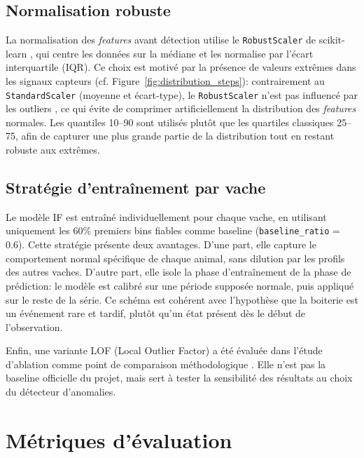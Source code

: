 \subsection{Normalisation robuste}
La normalisation des \textit{features} avant détection utilise le \texttt{RobustScaler} de
scikit-learn \citep{sklearn_api}, qui centre les données sur la médiane et les normalise
par l'écart interquartile (IQR). Ce choix est motivé par la présence de valeurs extrêmes
dans les signaux capteurs (cf. Figure~\ref{fig:distribution_steps}): contrairement au
\texttt{StandardScaler} (moyenne et écart-type), le \texttt{RobustScaler} n'est pas
influencé par les outliers \citep{leys2013detecting}, ce qui évite de comprimer
artificiellement la distribution des \textit{features} normales. Les quantiles 10--90 sont utilisés
plutôt que les quartiles classiques 25--75, afin de capturer une plus grande partie de
la distribution tout en restant robuste aux extrêmes.

\subsection{Stratégie d'entraînement par vache}
Le modèle IF est entraîné individuellement pour chaque vache, en utilisant uniquement les
60\% premiers bins fiables comme baseline (\texttt{baseline\_ratio} = 0.6). Cette stratégie
présente deux avantages. D'une part, elle capture le comportement normal
spécifique de chaque animal, sans dilution par les profils des autres vaches. D'autre part,
elle isole la phase d'entraînement de la phase de prédiction: le modèle est calibré sur
une période supposée normale, puis appliqué sur le reste de la série. Ce schéma est cohérent
avec l'hypothèse que la boiterie est un événement rare et tardif, plutôt qu'un état présent
dès le début de l'observation.

Enfin, une variante LOF (Local Outlier Factor) a été évaluée dans l'étude
d'ablation comme point de comparaison méthodologique \citep{breunig2000lof}. Elle n'est
pas la baseline officielle du projet, mais sert à tester la sensibilité des résultats au
choix du détecteur d'anomalies.

\FloatBarrier
\section{Métriques d'évaluation}

